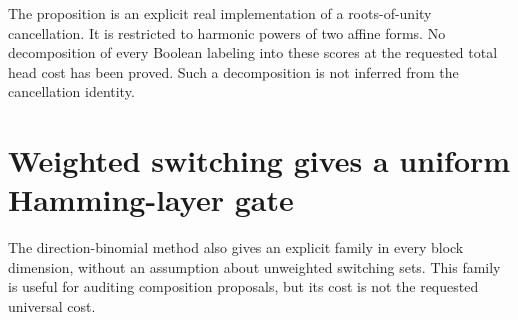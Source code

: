 \documentclass[11pt]{article}
\begin{document}
The proposition is an explicit real implementation of a roots-of-unity
cancellation. It is restricted to harmonic powers of two affine forms.
No decomposition of every Boolean labeling into these scores at the
requested total head cost has been proved. Such a decomposition is not
inferred from the cancellation identity.


\section{Weighted switching gives a uniform Hamming-layer gate}

The direction-binomial method also gives an explicit family in every
block dimension, without an assumption about unweighted switching sets.
This family is useful for auditing composition proposals, but its cost
is not the requested universal cost.
\end{document}
